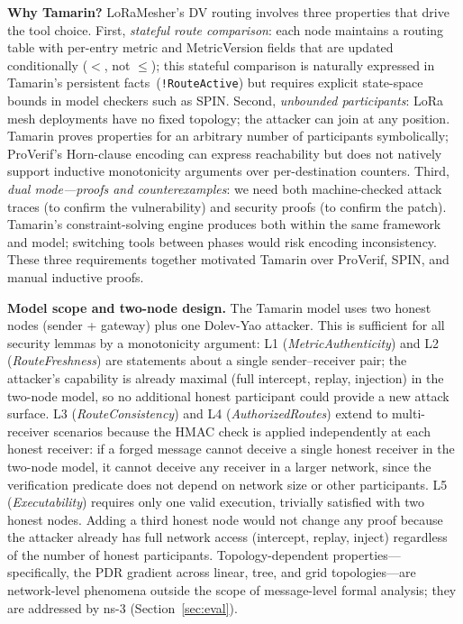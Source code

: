 \documentclass[preprint,12pt]{elsarticle}
\begin{document}
\textbf{Why Tamarin?}
LoRaMesher's DV routing involves three properties that drive the
tool choice.
First, \emph{stateful route comparison}: each node maintains a
routing table with per-entry metric and MetricVersion fields that
are updated conditionally ($<$, not $\leq$); this stateful
comparison is naturally expressed in Tamarin's persistent
facts~(\texttt{!RouteActive}) but requires explicit
state-space bounds in model checkers such as SPIN.
Second, \emph{unbounded participants}: LoRa mesh deployments have
no fixed topology; the attacker can join at any position. Tamarin
proves properties for an arbitrary number of participants
symbolically; ProVerif's Horn-clause encoding can express reachability
but does not natively support inductive monotonicity arguments over
per-destination counters.
Third, \emph{dual mode—proofs and counterexamples}: we need both
machine-checked attack traces (to confirm the vulnerability) and
security proofs (to confirm the patch). Tamarin's constraint-solving
engine produces both within the same framework and model;
switching tools between phases would risk encoding inconsistency.
These three requirements together motivated Tamarin over ProVerif,
SPIN, and manual inductive proofs.

\textbf{Model scope and two-node design.}
The Tamarin model uses two honest nodes (sender + gateway) plus
one Dolev-Yao attacker.
This is sufficient for all security lemmas by a monotonicity argument:
L1 (\emph{MetricAuthenticity}) and L2 (\emph{RouteFreshness}) are
statements about a single sender--receiver pair; the attacker's
capability is already maximal (full intercept, replay, injection)
in the two-node model, so no additional honest participant could
provide a new attack surface.
L3 (\emph{RouteConsistency}) and L4 (\emph{AuthorizedRoutes}) extend
to multi-receiver scenarios because the HMAC check is applied
independently at each honest receiver: if a forged message cannot
deceive a single honest receiver in the two-node model, it cannot
deceive any receiver in a larger network, since the verification
predicate does not depend on network size or other participants.
L5 (\emph{Executability}) requires only one valid execution, trivially
satisfied with two honest nodes.
Adding a third honest node would not change any proof because
the attacker already has full network access (intercept, replay,
inject) regardless of the number of honest participants.
Topology-dependent properties—specifically, the PDR gradient
across linear, tree, and grid topologies—are network-level
phenomena outside the scope of message-level formal analysis;
they are addressed by ns-3 (Section~\ref{sec:eval}).
\end{document}
